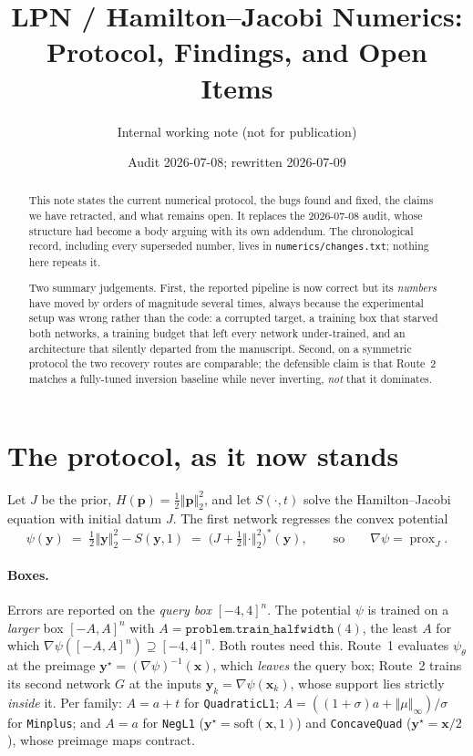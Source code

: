 \documentclass[11pt]{article}
\title{LPN / Hamilton--Jacobi Numerics:\\ Protocol, Findings, and Open Items}
\author{Internal working note (not for publication)}
\date{Audit 2026-07-08; rewritten 2026-07-09}
\newcommand{\file}[1]{\texttt{#1}}
\newcommand{\bx}{\boldsymbol{x}}
\newcommand{\by}{\boldsymbol{y}}
\newcommand{\bp}{\boldsymbol{p}}
\newcommand{\normsq}[1]{\left\Vert #1 \right\Vert_{2}^{2}}
\newcommand{\norminf}[1]{\left\Vert #1 \right\Vert_{\infty}}
\DeclareMathOperator{\prox}{prox}
\begin{document}
\maketitle

\begin{abstract}
This note states the current numerical protocol, the bugs found and fixed, the
claims we have retracted, and what remains open. It replaces the 2026-07-08
audit, whose structure had become a body arguing with its own addendum. The
chronological record, including every superseded number, lives in
\file{numerics/changes.txt}; nothing here repeats it.

Two summary judgements. First, the reported pipeline is now correct but its
\emph{numbers} have moved by orders of magnitude several times, always because
the experimental setup was wrong rather than the code: a corrupted target, a
training box that starved both networks, a training budget that left every
network under-trained, and an architecture that silently departed from the
manuscript. Second, on a symmetric protocol the two recovery routes are
comparable; the defensible claim is that Route~2 matches a fully-tuned inversion
baseline while never inverting, \emph{not} that it dominates.
\end{abstract}

\tableofcontents

\section{The protocol, as it now stands}
\label{sec:protocol}

Let $J$ be the prior, $H(\bp)=\tfrac12\normsq{\bp}$, and let
$S(\cdot,t)$ solve the Hamilton--Jacobi equation with initial datum $J$. The
first network regresses the convex potential
\[
  \psi(\by) \;=\; \tfrac12\normsq{\by} - S(\by,1)
  \;=\; \bigl(J + \tfrac12\normsq{\cdot}\bigr)^{*}(\by),
  \qquad\text{so}\qquad \nabla\psi = \prox_{J}.
\]

\paragraph{Boxes.} Errors are reported on the \emph{query box} $[-4,4]^{n}$.
The potential $\psi$ is trained on a \emph{larger} box $[-A,A]^{n}$ with
$A=\texttt{problem.train\_halfwidth}(4)$, the least $A$ for which
$\nabla\psi([-A,A]^{n}) \supseteq [-4,4]^{n}$. Both routes need this. Route~1
evaluates $\psi_{\theta}$ at the preimage $\by^{\star}=(\nabla\psi)^{-1}(\bx)$,
which \emph{leaves} the query box; Route~2 trains its second network $G$ at the
inputs $\by_{k}=\nabla\psi(\bx_{k})$, whose support lies strictly \emph{inside}
it. Per family: $A=a+t$ for \texttt{QuadraticL1};
$A=((1+\sigma)a+\norminf{\mu})/\sigma$ for \texttt{Minplus}; and $A=a$ for
\texttt{NegL1} ($\by^{\star}=\mathrm{soft}(\bx,1)$) and \texttt{ConcaveQuad}
($\by^{\star}=\bx/2$), whose preimage maps contract.
\end{document}

